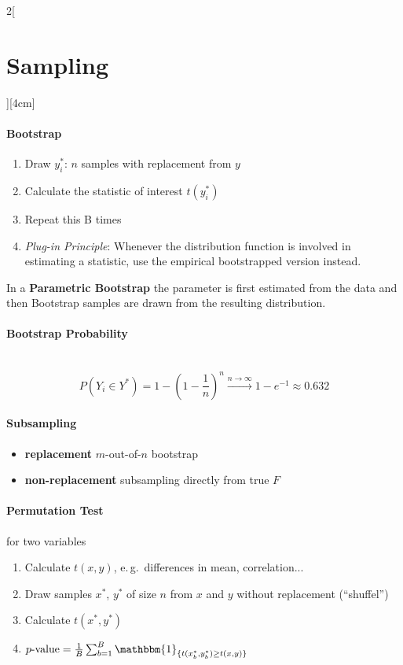 \documentclass[8pt]{extarticle}
\begin{document}
\begin{multicols}{2}[\section{Sampling}][4cm]

\paragraph{Bootstrap}

\begin{enumerate}
\item Draw $y^*_i$: $n$ samples with replacement from $y$
\item Calculate the statistic of interest $t(y_i^*)$
\item Repeat this B times
\item \noindent \textit{Plug-in Principle}:
Whenever the distribution function is involved in estimating a statistic, use the empirical bootstrapped version instead.
\end{enumerate}

\noindent In a \textbf{Parametric Bootstrap} the parameter is first estimated from the data and then Bootstrap samples are drawn from the resulting distribution.

\paragraph{Bootstrap Probability} \ \\

$$P(Y_i\in Y^*) = 1-(1-\frac{1}{n})^n\overset{n\rightarrow\infty}{\rightarrow} 1-e^{-1} \approx 0.632$$


\paragraph{Subsampling}

\begin{itemize}
\item \textbf{replacement} $m$-out-of-$n$ bootstrap
\item \textbf{non-replacement} subsampling directly from true $F$
\end{itemize}

\paragraph{Permutation Test} for two variables

\begin{enumerate}
\item Calculate $t(x,y)$, e.\,g.\ differences in mean, correlation...
\item Draw samples $x^*$, $y^*$ of size $n$ from $x$ and $y$ without replacement (``shuffel'')\label{draw}
\item Calculate $t(x^*, y^*)$ 
\item $p\text{-value} = \frac{1}{B}\sum_{b=1}^B \mathbbm{1}_{\{t(x_b^*,y_b^*)\geq t(x,y)\}}$
\end{enumerate}


\end{multicols}
\end{document}
